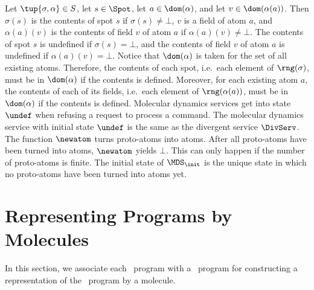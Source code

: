\documentclass[fleqn]{llncs}
\begin{document}
Let $\tup{\sigma,\alpha} \in S$, let $s \in \Spot$, let
$a \in \dom(\alpha)$, and let $v \in \dom(\alpha(a))$.
Then $\sigma(s)$ is the contents of spot $s$ if $\sigma(s) \neq \bot$,
$v$ is a field of atom $a$, and $\alpha(a)(v)$ is the contents of field
$v$ of atom $a$ if $\alpha(a)(v) \neq \bot$.
The contents of spot $s$ is undefined if $\sigma(s) = \bot$, and the
contents of field $v$ of atom $a$ is undefined if $\alpha(a)(v) = \bot$.
Notice that $\dom(\alpha)$ is taken for the set of all existing atoms.
Therefore, the contents of each spot, i.e.\ each element of
$\rng(\sigma)$, must be in $\dom(\alpha)$ if the contents is defined.
Moreover, for each existing atom $a$, the contents of each of its
fields, i.e.\ each element of $\rng(\alpha(a))$, must be in
$\dom(\alpha)$ if the contents is defined.
Molecular dynamics services get into state $\undef$ when refusing a
request to process a command.
The molecular dynamics service with initial state $\undef$ is the same
as the divergent service $\DivServ$.
The function $\newatom$ turns proto-atoms into atoms.
After all proto-atoms have been turned into atoms, $\newatom$ yields
$\bot$.
This can only happen if the number of proto-atoms is finite.
The initial state of $\MDS_\init$ is the unique state in which no
proto-atoms have been turned into atoms yet.

\section{Representing Programs by Molecules}
\label{sect-representation}

In this section, we associate each \PGLD\ program with a \PGA\ program
for constructing a representation of the \PGLD\ program by a molecule.
\end{document}

